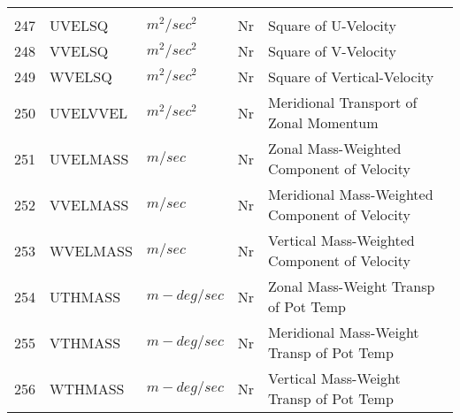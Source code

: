 \begin{tabular}{lllll}
\begin{minipage}[t]{3in}
         \end{minipage}\\
247& UVELSQ   & $m^2/sec^2$ & Nr
         &\begin{minipage}[t]{3in}
          {Square of U-Velocity} 
         \end{minipage}\\
248& VVELSQ   & $m^2/sec^2$ & Nr
         &\begin{minipage}[t]{3in}
          {Square of V-Velocity} 
         \end{minipage}\\
249& WVELSQ   & $m^2/sec^2$ & Nr
         &\begin{minipage}[t]{3in}
          {Square of Vertical-Velocity} 
         \end{minipage}\\
250& UVELVVEL & $m^2/sec^2$ & Nr
         &\begin{minipage}[t]{3in}
          {Meridional Transport of Zonal Momentum} 
         \end{minipage}\\
251& UVELMASS & $m/sec$ & Nr
         &\begin{minipage}[t]{3in}
          {Zonal Mass-Weighted Component of Velocity} 
         \end{minipage}\\
252& VVELMASS & $m/sec$ & Nr
         &\begin{minipage}[t]{3in}
          {Meridional Mass-Weighted Component of Velocity} 
         \end{minipage}\\
253& WVELMASS & $m/sec$ & Nr
         &\begin{minipage}[t]{3in}
          {Vertical Mass-Weighted Component of Velocity} 
         \end{minipage}\\
254& UTHMASS  & $m-deg/sec$ & Nr
         &\begin{minipage}[t]{3in}
          {Zonal Mass-Weight Transp of Pot Temp} 
         \end{minipage}\\
255& VTHMASS  & $m-deg/sec$ & Nr
         &\begin{minipage}[t]{3in}
          {Meridional Mass-Weight Transp of Pot Temp} 
         \end{minipage}\\
256& WTHMASS  & $m-deg/sec$ & Nr
         &\begin{minipage}[t]{3in}
          {Vertical Mass-Weight Transp of Pot Temp} 

\end{minipage}
\end{tabular}
